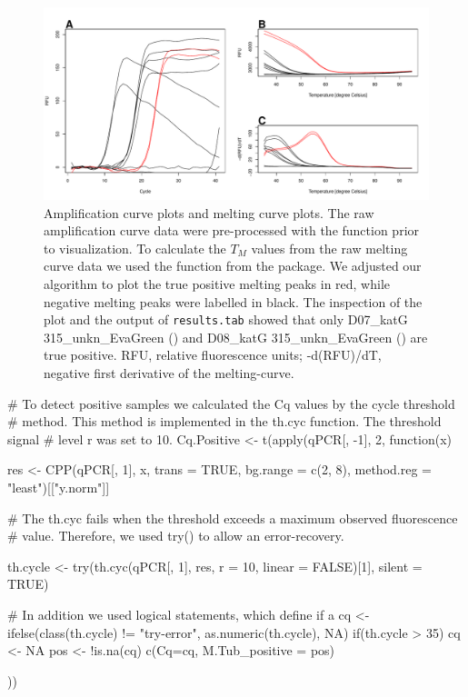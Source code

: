 \begin{figure}[htbp]
  \centering
  \includegraphics[clip=true, trim=0.05cm 0.35cm 0.85cm 1cm, width=12cm]{figures/amp_melt.pdf} 
\caption{Amplification curve plots and melting curve plots.  The raw 
amplification curve data were pre-processed with the  function prior 
to visualization. To calculate the $T_{M}$ values from the raw melting curve 
data  we used the  function from the  
package.  We adjusted our algorithm to plot the true positive 
melting peaks in red, while negative melting peaks were labelled in black. The 
inspection of the plot and the output of \texttt{results.tab} showed that only 
D07\_katG 315\_unkn\_EvaGreen (\textcolor{red}\textemdash) and D08\_katG 
315\_unkn\_EvaGreen (\textcolor{red}\textemdash) are true positive. RFU, 
relative fluorescence units; -d(RFU)/dT, negative first derivative of the melting-curve.} 
\label{figure:amp_melt}
\end{figure}

\begin{example}
# To detect positive samples we calculated the Cq values by the cycle threshold 
# method. This method is implemented in the th.cyc function. The threshold signal 
# level r was set to 10.
Cq.Positive <- t(apply(qPCR[, -1], 2, function(x)
{
  res <- CPP(qPCR[, 1], x, trans = TRUE, bg.range = c(2, 8),
             method.reg = "least")[["y.norm"]]
             
  # The th.cyc fails when the threshold exceeds a maximum observed fluorescence 
  # value. Therefore, we used try() to allow an error-recovery.
  
  th.cycle <- try(th.cyc(qPCR[, 1], res, r = 10, linear = FALSE)[1], silent = TRUE)
  
  # In addition we used logical statements, which define if a 
  cq <- ifelse(class(th.cycle) != "try-error", as.numeric(th.cycle), NA)
  if(th.cycle > 35) cq <- NA
  pos <- !is.na(cq)
  c(Cq=cq, M.Tub_positive = pos)
}
))
\end{example}

